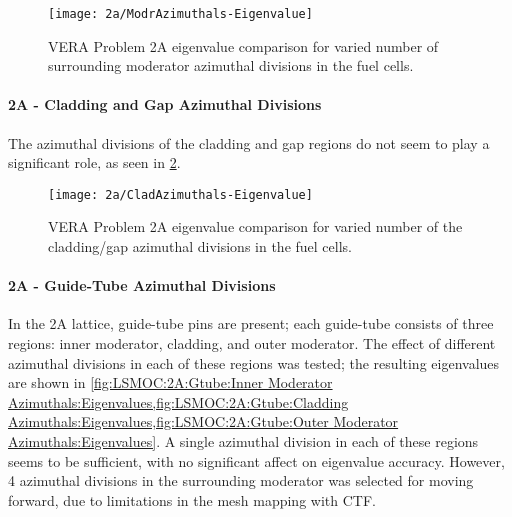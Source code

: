 {{{{{          \begin{figure}
            \centering
            \texttt{[image: 2a/ModrAzimuthals-Eigenvalue]}
            \caption{VERA Problem 2A eigenvalue comparison for varied number of surrounding moderator azimuthal divisions in the fuel cells. \label{fig:LSMOC:2A:Moderator Azimuthal:Eigenvalues}}
          \end{figure}
        }
        \paragraph{2A - Cladding and Gap Azimuthal Divisions}{
          The azimuthal divisions of the cladding and gap regions do not seem to play a significant role, as seen in \cref{fig:LSMOC:2A:Clad Azimuthal:Eigenvalues}.

          \begin{figure}
            \centering
            \texttt{[image: 2a/CladAzimuthals-Eigenvalue]}
            \caption{VERA Problem 2A eigenvalue comparison for varied number of the cladding/gap azimuthal divisions in the fuel cells. \label{fig:LSMOC:2A:Clad Azimuthal:Eigenvalues}}
          \end{figure}
        }
        \paragraph{2A - Guide-Tube Azimuthal Divisions}{
          In the 2A lattice, guide-tube pins are present; each guide-tube consists of three regions: inner moderator, cladding, and outer moderator.
          The effect of different azimuthal divisions in each of these regions was tested; the resulting eigenvalues are shown in \cref{fig:LSMOC:2A:Gtube:Inner Moderator Azimuthals:Eigenvalues,fig:LSMOC:2A:Gtube:Cladding Azimuthals:Eigenvalues,fig:LSMOC:2A:Gtube:Outer Moderator Azimuthals:Eigenvalues}.
          A single azimuthal division in each of these regions seems to be sufficient, with no significant affect on eigenvalue accuracy.
          However, 4 azimuthal divisions in the surrounding moderator was selected for moving forward, due to limitations in the mesh mapping with \ac{CTF}.

}}}}}
